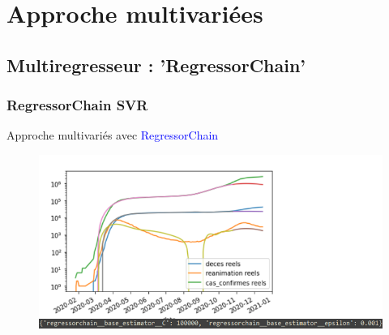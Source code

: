 \documentclass{beamer}
\begin{document}
\section{Approche multivariées}
\subsection{Multiregresseur : 'RegressorChain'}
\begin{frame}
	\frametitle{RegressorChain SVR}
	Approche multivariés avec \textcolor{blue}{RegressorChain}\\
	\begin{figure}[h]
		\includegraphics[scale=0.8]{mulitregr_epic_fail2}
	\end{figure}
\end{frame}
\end{document}
